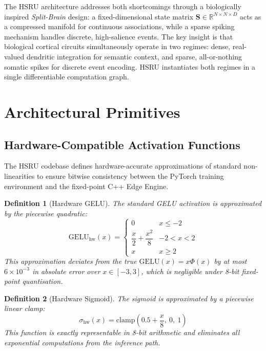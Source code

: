 \documentclass[11pt]{article}
\newtheorem{definition}{Definition}[section]
\begin{document}
The HSRU architecture addresses both shortcomings through a biologically inspired \emph{Split-Brain} design: a fixed-dimensional state matrix $\mathbf{S} \in \mathbb{R}^{N \times N \times D}$ acts as a compressed manifold for continuous associations, while a sparse spiking mechanism handles discrete, high-salience events. The key insight is that biological cortical circuits simultaneously operate in two regimes: dense, real-valued dendritic integration for semantic context, and sparse, all-or-nothing somatic spikes for discrete event encoding. HSRU instantiates both regimes in a single differentiable computation graph.

\section{Architectural Primitives}

\subsection{Hardware-Compatible Activation Functions}

The HSRU codebase defines hardware-accurate approximations of standard non-linearities to ensure bitwise consistency between the PyTorch training environment and the fixed-point C++ Edge Engine.

\begin{definition}[Hardware GELU]
The standard GELU activation is approximated by the piecewise quadratic:
\begin{equation}
    \mathrm{GELU}_{\mathrm{hw}}(x) = \begin{cases}
        0 & x \leq -2 \\
        \dfrac{x}{2} + \dfrac{x^2}{8} & -2 < x < 2 \\
        x & x \geq 2
    \end{cases}
\end{equation}
This approximation deviates from the true $\mathrm{GELU}(x) = x \Phi(x)$ by at most $6 \times 10^{-3}$ in absolute error over $x \in [-3, 3]$, which is negligible under 8-bit fixed-point quantisation.
\end{definition}

\begin{definition}[Hardware Sigmoid]
The sigmoid is approximated by a piecewise linear clamp:
\begin{equation}
    \sigma_{\mathrm{hw}}(x) = \mathrm{clamp}\!\left(0.5 + \frac{x}{8},\ 0,\ 1\right)
\end{equation}
This function is exactly representable in 8-bit arithmetic and eliminates all exponential computations from the inference path.
\end{definition}
\end{document}
